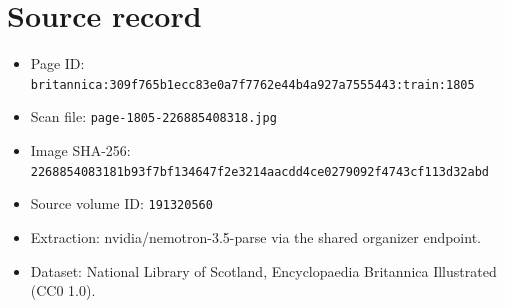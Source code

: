 \documentclass{article}
\begin{document}
\section*{Source record}
\begin{itemize}
\item Page ID: \texttt{britannica:309f765b1ecc83e0a7f7762e44b4a927a7555443:train:1805}
\item Scan file: \texttt{page-1805-226885408318.jpg}
\item Image SHA-256: \texttt{2268854083181b93f7bf134647f2e3214aacdd4ce0279092f4743cf113d32abd}
\item Source volume ID: \texttt{191320560}
\item Extraction: nvidia/nemotron-3.5-parse via the shared organizer endpoint.
\item Dataset: National Library of Scotland, Encyclopaedia Britannica Illustrated (CC0 1.0).
\end{itemize}
\end{document}

